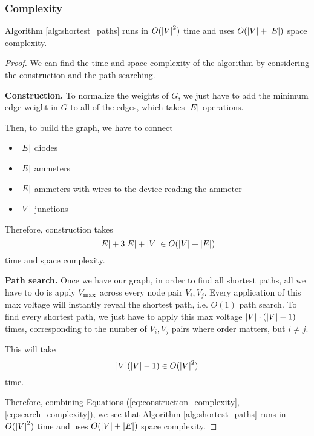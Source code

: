 \documentclass{article}
\begin{document}
\subsubsection{Complexity}
\begin{theorem}
	Algorithm \ref{alg:shortest_paths} runs in $O(\abs{V}^2)$ time and uses $O(\abs{V} + \abs{E})$ space complexity.
\end{theorem}
\begin{proof}
	We can find the time and space complexity of the algorithm by considering
	the construction and the path searching.

	\textbf{Construction.} To normalize the weights of $G$, we just have to add
	the minimum edge weight in $G$ to all of the edges, which takes $\abs{E}$
	operations.

	Then, to build the graph, we have to connect
	\begin{itemize}
		\item $\abs{E}$ diodes
		\item $\abs{E}$ ammeters
		\item $\abs{E}$ ammeters with wires to the device reading the ammeter
		\item $\abs{V}$ junctions
	\end{itemize}

	Therefore, construction takes
	\begin{equation}
		\abs{E} + 3\abs{E} + \abs{V} \in O(\abs{V} + \abs{E})
		\label{eq:construction_complexity}
	\end{equation}
	time and space complexity.

	\textbf{Path search.} Once we have our graph, in order to find all shortest
	paths, all we have to do is apply $V_\text{max}$ across every node pair $V_i,
	V_j$. Every application of this max voltage will instantly reveal the
	shortest path, i.e. $O(1)$ path search. To find every shortest path, we
	just have to apply this max voltage $\abs{V} \cdot (\abs{V}-1)$ times,
	corresponding to the number of $V_i, V_j$ pairs where order matters, but $i
	\neq j$.

	This will take
	\begin{equation}
		\abs{V}(\abs{V} - 1) \in O(\abs{V}^2)
		\label{eq:search_complexity}
	\end{equation}
	time.

	Therefore, combining Equations (\ref{eq:construction_complexity},
	\ref{eq:search_complexity}), we see that Algorithm \ref{alg:shortest_paths}
	runs in $O(\abs{V}^2)$ time and uses $O(\abs{V} + \abs{E})$ space
	complexity.
\end{proof}
\end{document}

